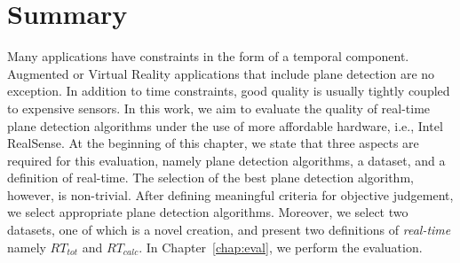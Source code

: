 \documentclass[main.tex]{subfiles}
\begin{document}
\section{Summary}
Many applications have constraints in the form of a temporal component. Augmented or Virtual Reality applications that include plane detection
are no exception. In addition to time constraints, good quality is usually tightly coupled to expensive sensors.
In this work, we aim to evaluate the quality of real-time plane detection algorithms under the use of more affordable hardware, i.e., Intel RealSense.
At the beginning of this chapter, we state that three aspects are required for this evaluation, namely plane detection algorithms, a dataset, and a definition 
of real-time.
The selection of the best plane detection algorithm, however, is non-trivial. After defining meaningful criteria for objective judgement, we 
select appropriate plane detection algorithms. Moreover, we select two datasets, one of which is a novel creation,
 and present two definitions of \textit{real-time} namely $RT_{tot}$ and $RT_{calc}$.
In Chapter~\ref{chap:eval}, we perform the evaluation.
\end{document}
